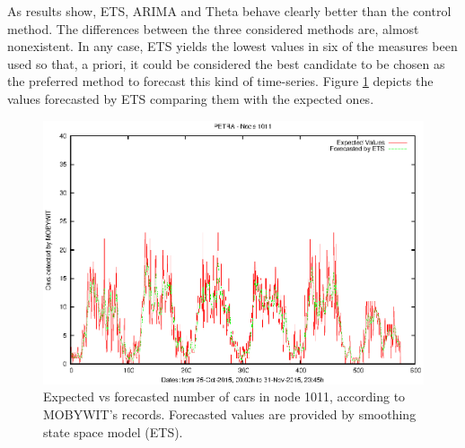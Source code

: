 As results show, ETS, ARIMA and Theta behave clearly better than the control method. The differences between the three considered methods are, almost nonexistent. In any case, ETS yields the lowest values in six of the measures been used so that, a priori, it could be considered the best candidate to be chosen as the preferred method to forecast this kind of time-series. Figure \ref{fig:forecasted-values} depicts the values forecasted by ETS comparing them with the expected ones.


\begin{figure}[!ht]
	\begin{center}
		\includegraphics[width=14cm]{imgs/PETRA/forecasting-PETRA-1011.eps}
		\caption{Expected vs forecasted number of cars in node 1011, according to MOBYWIT's records. Forecasted values are provided by smoothing state space model (ETS). }
		\label{fig:forecasted-values}
	\end{center}
\end{figure}



